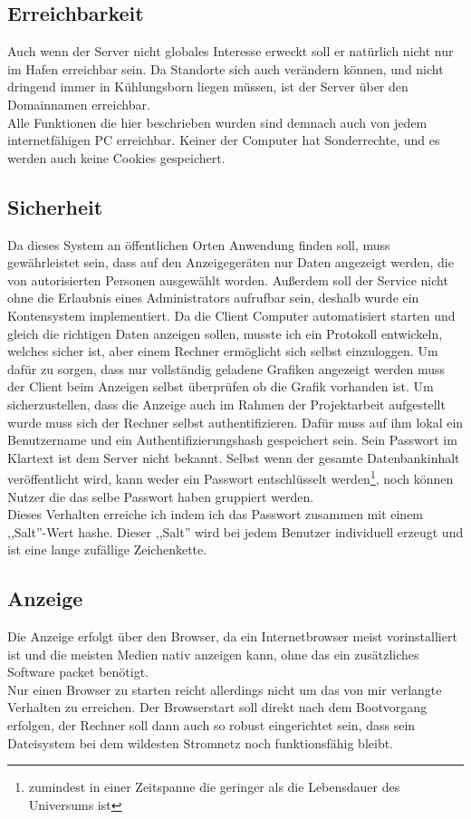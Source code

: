 \subsection{Erreichbarkeit} %
Auch wenn der Server nicht globales Interesse erweckt soll er natürlich nicht nur im Hafen erreichbar sein.
Da Standorte sich auch verändern können,
und nicht dringend immer in Kühlungsborn liegen müssen, ist der Server über den Domainnamen  erreichbar. \\
Alle Funktionen die hier beschrieben wurden sind demnach auch von jedem internetfähigen PC erreichbar. Keiner der Computer hat Sonderrechte,
und es werden auch keine Cookies gespeichert.

\subsection{Sicherheit} %
Da dieses System an öffentlichen Orten Anwendung finden soll,
muss gewährleistet sein, dass auf den Anzeigegeräten nur Daten angezeigt werden,
die von autorisierten Personen ausgewählt worden.
Außerdem soll der Service nicht ohne die Erlaubnis eines Administrators aufrufbar sein,
deshalb wurde ein Kontensystem implementiert.
Da die Client Computer automatisiert starten und gleich die richtigen Daten anzeigen sollen,
musste ich ein Protokoll entwickeln, welches sicher ist,
aber einem Rechner ermöglicht sich selbst einzuloggen.
Um dafür zu sorgen, dass nur vollständig geladene Grafiken angezeigt werden muss
der Client beim Anzeigen selbst überprüfen ob die Grafik vorhanden ist.
Um sicherzustellen, dass die Anzeige auch im Rahmen der Projektarbeit aufgestellt
wurde muss sich der Rechner selbst authentifizieren.
Dafür muss auf ihm lokal ein Benutzername und ein
Authentifizierungshash gespeichert sein. Sein Passwort im Klartext ist dem Server nicht bekannt.
Selbst wenn der gesamte Datenbankinhalt veröffentlicht wird, kann weder ein Passwort
entschlüsselt werden\footnote{zumindest in einer Zeitspanne die
geringer als die Lebensdauer des Universums ist}, noch können Nutzer die das selbe Passwort haben
gruppiert werden.\\
Dieses Verhalten erreiche ich indem ich das Passwort zusammen mit einem ,,Salt''-Wert hashe. Dieser ,,Salt'' wird bei jedem Benutzer individuell erzeugt und ist eine lange zufällige Zeichenkette.

\subsection{Anzeige}
Die Anzeige erfolgt über den Browser, da ein Internetbrowser meist vorinstalliert ist
und die meisten Medien nativ anzeigen kann, ohne das ein zusätzliches Software packet
benötigt. \\
Nur einen Browser zu starten reicht allerdings nicht um das von mir verlangte Verhalten
zu erreichen. Der Browserstart soll direkt nach dem Bootvorgang erfolgen, der Rechner soll
dann auch so robust eingerichtet sein, dass sein Dateisystem bei dem wildesten Stromnetz
noch funktionsfähig bleibt.
